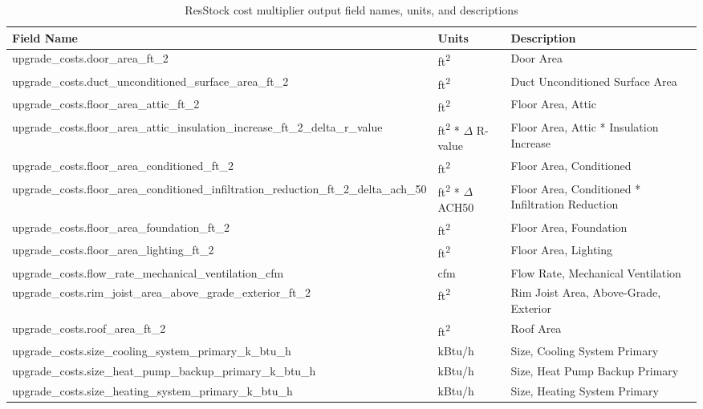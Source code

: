 \begin{longtable}[]{ |p{}|p{2.5cm}|p{7.2cm}| }
\caption{ResStock cost multiplier output field names, units, and descriptions} \label{table:cost_multipliers} \\
\toprule\noalign{}
\textbf{Field Name} & \textbf{Units} & \textbf{Description} \\
\midrule\noalign{}
\endhead
\bottomrule\noalign{}
\endlastfoot
upgrade\_costs.door\_area\_ft\_2 & ft\textsuperscript{2} & Door Area \\ \hline
upgrade\_costs.duct\_unconditioned\_surface\_area\_ft\_2 & ft\textsuperscript{2}& Duct Unconditioned Surface Area \\ \hline
upgrade\_costs.floor\_area\_attic\_ft\_2 & ft\textsuperscript{2}& Floor Area, Attic \\ \hline
upgrade\_costs.floor\_area\_attic\_insulation\_increase\_ft\_2\_delta\_r\_value & ft\textsuperscript{2} * $\Delta$ R-value& Floor Area, Attic * Insulation Increase \\ \hline
upgrade\_costs.floor\_area\_conditioned\_ft\_2 & ft\textsuperscript{2}& Floor Area, Conditioned \\ \hline
upgrade\_costs.floor\_area\_conditioned\_infiltration\_reduction\_ft\_2\_delta\_ach\_50 & ft\textsuperscript{2} * $\Delta$ ACH50& Floor Area, Conditioned * Infiltration Reduction \\ \hline
upgrade\_costs.floor\_area\_foundation\_ft\_2 & ft\textsuperscript{2}& Floor Area, Foundation \\ \hline
upgrade\_costs.floor\_area\_lighting\_ft\_2 & ft\textsuperscript{2}& Floor Area, Lighting \\ \hline
upgrade\_costs.flow\_rate\_mechanical\_ventilation\_cfm  & cfm & Flow Rate, Mechanical Ventilation \\ \hline
upgrade\_costs.rim\_joist\_area\_above\_grade\_exterior\_ft\_2  & ft\textsuperscript{2}& Rim Joist Area, Above-Grade, Exterior \\ \hline
upgrade\_costs.roof\_area\_ft\_2  &  ft\textsuperscript{2}& Roof Area \\ \hline
upgrade\_costs.size\_cooling\_system\_primary\_k\_btu\_h  & kBtu/h & Size, Cooling System Primary \\ \hline
upgrade\_costs.size\_heat\_pump\_backup\_primary\_k\_btu\_h & kBtu/h & Size, Heat Pump Backup Primary \\ \hline
upgrade\_costs.size\_heating\_system\_primary\_k\_btu\_h & kBtu/h & Size, Heating System Primary \\ \hline

\end{longtable}

